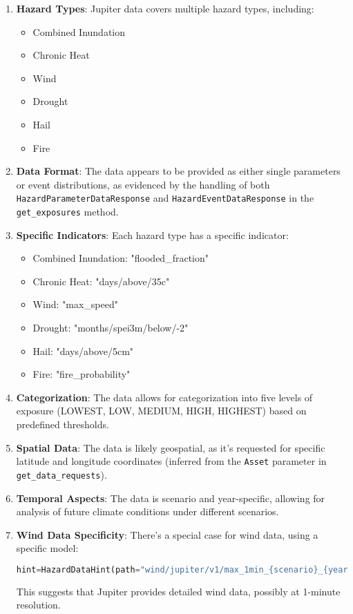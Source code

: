 \documentclass{article}
\begin{document}
\begin{enumerate}
    \item \textbf{Hazard Types}: Jupiter data covers multiple hazard types, including:
    \begin{itemize}
        \item Combined Inundation
        \item Chronic Heat
        \item Wind
        \item Drought
        \item Hail
        \item Fire
    \end{itemize}

    \item \textbf{Data Format}: The data appears to be provided as either single parameters or event distributions, as evidenced by the handling of both \texttt{HazardParameterDataResponse} and \texttt{HazardEventDataResponse} in the \texttt{get\_exposures} method.

    \item \textbf{Specific Indicators}: Each hazard type has a specific indicator:
    \begin{itemize}
        \item Combined Inundation: "flooded\_fraction"
        \item Chronic Heat: "days/above/35c"
        \item Wind: "max\_speed"
        \item Drought: "months/spei3m/below/-2"
        \item Hail: "days/above/5cm"
        \item Fire: "fire\_probability"
    \end{itemize}

    \item \textbf{Categorization}: The data allows for categorization into five levels of exposure (LOWEST, LOW, MEDIUM, HIGH, HIGHEST) based on predefined thresholds.

    \item \textbf{Spatial Data}: The data is likely geospatial, as it's requested for specific latitude and longitude coordinates (inferred from the \texttt{Asset} parameter in \texttt{get\_data\_requests}).

    \item \textbf{Temporal Aspects}: The data is scenario and year-specific, allowing for analysis of future climate conditions under different scenarios.

    \item \textbf{Wind Data Specificity}: There's a special case for wind data, using a specific model:
    \begin{lstlisting}[language=Python]
hint=HazardDataHint(path="wind/jupiter/v1/max_1min_{scenario}_{year}")
    \end{lstlisting}
    This suggests that Jupiter provides detailed wind data, possibly at 1-minute resolution.
\end{enumerate}
\end{document}
